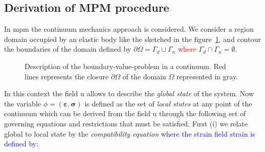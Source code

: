 \documentclass[preprint,12pt,a4paper]{elsarticle}
\newcommand{\tens}[1]{
  \ensuremath{\mathbf{{#1}}}
}
\begin{document}
\subsection{Derivation of MPM procedure}
\label{sec:derivation-mpm}

In \acrshort{mpm} the continuum mechanics approach is considered. We consider a region \gls{domain} occupied by an elastic body like
the sketched in the figure~\ref{fig:Continuum-solid}, and \gls{contour} the boundaries of the domain defined by $\partial \Omega
= \Gamma_d \cup \Gamma_n$  \textcolor{red}{where} $\Gamma_d \cap  \Gamma_n = \emptyset$.
\begin{figure}
  \centering
  \caption{Description of the boundary-value-problem in a
    continuum. Red lines represents the closure $\partial \Omega$
    of the domain $\Omega$ represented in gray.}
  \label{fig:Continuum-solid}
\end{figure}
In this context the field \gls{u} allows to describe the \textit{global state}
of the system. Now the variable $\phi =
(\tens{\varepsilon},\tens{\sigma})$ is defined as the set of \textit{local
  states} at any point of the continuum which can be derived from the
field \gls{u} through the following set of governing equations and
restrictions that must be satisfied. First (i) we relate global to local state by the \textit{compatibility equation} \textcolor{blue}{where the strain field \gls{strain} is defined by}:
\end{document}
